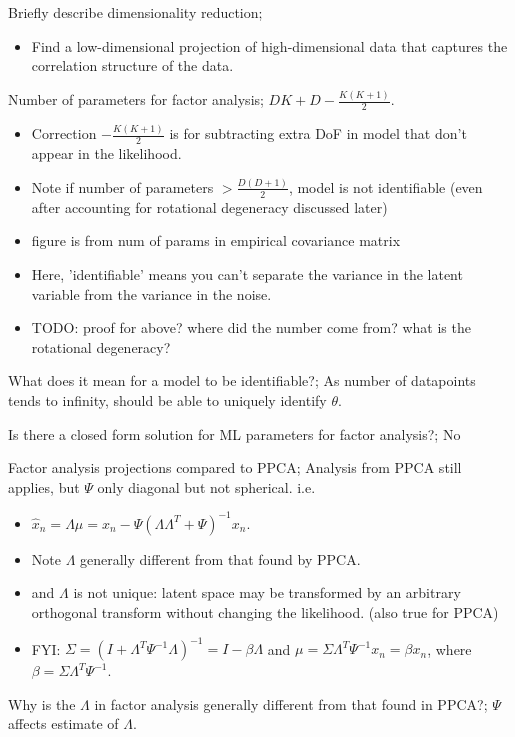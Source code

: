 \documentclass{article}
\begin{document}
Briefly describe dimensionality reduction; \begin{itemize} \item Find a low-dimensional projection of high-dimensional data that captures the correlation structure of the data.  \end{itemize}

Number of parameters for factor analysis; $DK + D - \frac{K(K+1)}{2}$. \begin{itemize} \item Correction $- \frac{K(K+1)}{2}$ is for subtracting extra DoF in model that don't appear in the likelihood.  \item Note if number of parameters $> \frac{D(D+1)}{2}$, model is not identifiable (even after accounting for rotational degeneracy discussed later) \item figure is from num of params in empirical covariance matrix \item Here, 'identifiable' means you can't separate the variance in the latent variable from the variance in the noise.  \item TODO: proof for above? where did the number come from? what is the rotational degeneracy?  \end{itemize}

What does it mean for a model to be identifiable?; As number of datapoints tends to infinity, should be able to uniquely identify $\theta$.

Is there a closed form solution for ML parameters for factor analysis?; No

Factor analysis projections compared to PPCA; Analysis from PPCA still applies, but $\Psi$ only diagonal but not spherical. i.e. \begin{itemize} \item $\hat{x}_n=\Lambda\mu=x_n - \Psi(\Lambda\Lambda^T+\Psi)^{-1}x_n$.  \item Note $\Lambda$ generally different from that found by PPCA.  \item and $\Lambda$ is not unique: latent space may be transformed by an arbitrary orthogonal transform without changing the likelihood. (also true for PPCA) \item FYI: $\Sigma = (I+\Lambda^T\Psi^{-1}\Lambda)^{-1}=I-\beta\Lambda$ and $\mu=\Sigma\Lambda^T\Psi^{-1}x_n=\beta x_n$, where $\beta = \Sigma\Lambda^T\Psi^{-1}$. \end{itemize}

Why is the $\Lambda$ in factor analysis generally different from that found in PPCA?; $\Psi$ affects estimate of $\Lambda$.
\end{document}
